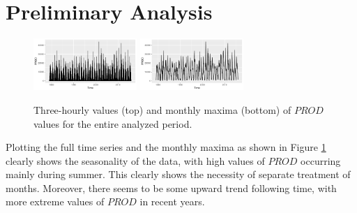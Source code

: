 \documentclass[10pt,conference,compsocconf]{IEEEtran}
\begin{document}
\section*{Preliminary Analysis}
\begin{figure}
	\centering
	\includegraphics[width=0.35\textwidth]{../plots/full_time_series.pdf}
	\includegraphics[width=0.35\textwidth]{../plots/monthly_max_series.pdf}
	\caption{Three-hourly values (top) and monthly maxima (bottom) of $PROD$ values for the entire analyzed period.}
	\label{fig:timeseries}
\end{figure}
Plotting the full time series and the monthly maxima as shown in Figure \ref{fig:timeseries} clearly shows the seasonality of the data, with high values of $PROD$ occurring mainly during summer. This clearly shows the necessity of separate treatment of months. Moreover, there seems to be some upward trend following time, with more extreme values of $PROD$ in recent years.
\end{document}
